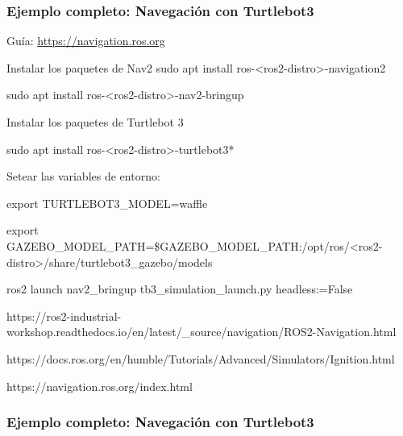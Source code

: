 \begin{frame}
	\frametitle{Ejemplo completo: Navegación con Turtlebot3}
    
    Guía: \href{https://navigation.ros.org}{https://navigation.ros.org}
    
    Instalar los paquetes de Nav2 
    sudo apt install ros-<ros2-distro>-navigation2
    
    sudo apt install ros-<ros2-distro>-nav2-bringup
    
    Instalar los paquetes de Turtlebot 3
    
    sudo apt install ros-<ros2-distro>-turtlebot3*
    
    Setear las variables de entorno:
    
    export TURTLEBOT3\_MODEL=waffle
    
    export GAZEBO\_MODEL\_PATH=\$GAZEBO\_MODEL\_PATH:/opt/ros/<ros2-distro>/share/turtlebot3\_gazebo/models
    
    
    ros2 launch nav2\_bringup tb3\_simulation\_launch.py headless:=False
  
    
    https://ros2-industrial-workshop.readthedocs.io/en/latest/\_source/navigation/ROS2-Navigation.html
    
    https://docs.ros.org/en/humble/Tutorials/Advanced/Simulators/Ignition.html
    
    https://navigation.ros.org/index.html

\end{frame}


\begin{frame}[fragile]
    \frametitle{Ejemplo completo: Navegación con Turtlebot3}
    
    \begin{center}
    \end{center}
    
\end{frame}

